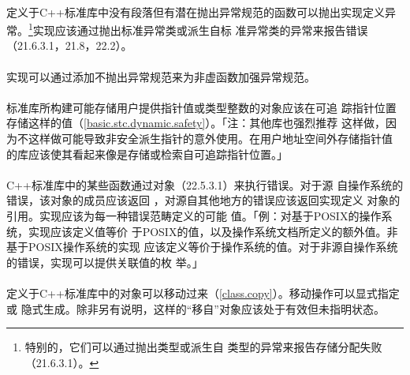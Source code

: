\paragraph{}
定义于C++标准库中没有段落但有潜在抛出异常规范的函数可以抛出实现定义异
常。\footnote{特别的，它们可以通过抛出类型或派生自
类型的异常来报告存储分配失败（21.6.3.1）。}实现应该通过抛出标准异常类或派生自标
准异常类的异常来报告错误（21.6.3.1，21.8，22.2）。

\paragraph{}
实现可以通过添加不抛出异常规范来为非虚函数加强异常规范。

\paragraph{}
标准库所构建可能存储用户提供指针值或类型整数的对象应该在可追
踪指针位置存储这样的值（\ref{basic.stc.dynamic.safety}）。「注：其他库也强烈推荐
这样做，因为不这样做可能导致非安全派生指针的意外使用。在用户地址空间外存储指针值
的库应该使其看起来像是存储或检索自可追踪指针位置。」

\paragraph{}
C++标准库中的某些函数通过对象（22.5.3.1）来执行错误。对于源
自操作系统的错误，该对象的成员应该返回
，对源自其他地方的错误应该返回实现定义
对象的引用。实现应该为每一种错误范畴定义的可能
值。「例：对基于POSIX的操作系统，实现应该定义值等价
于POSIX的值，以及操作系统文档所定义的额外值。非基于POSIX操作系统的实现
应该定义等价于操作系统的值。对于非源自操作系统的错误，实现可以提供关联值的枚
举。」

\paragraph{}
定义于C++标准库中的对象可以移动过来（\ref{class.copy}）。移动操作可以显式指定或
隐式生成。除非另有说明，这样的“移自”对象应该处于有效但未指明状态。
